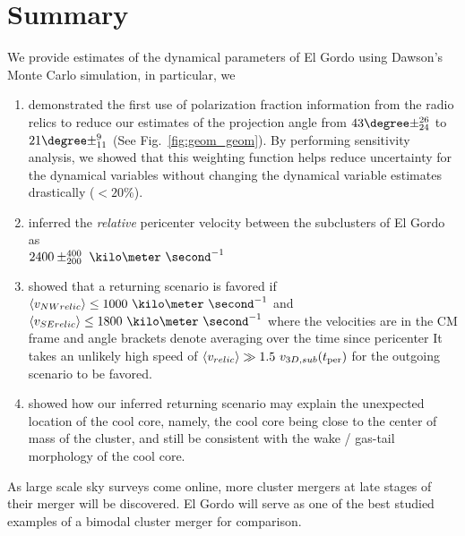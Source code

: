 \documentclass[ucdthesis.tex]{subfiles}
\begin{document}
    \section{Summary} 
    We provide estimates of the dynamical parameters of El Gordo using Dawson's
    Monte Carlo simulation, in particular, we 
    \begin{enumerate}
    	\item demonstrated the first use of polarization fraction information from
    		the radio relics to reduce our estimates of the projection angle from
    		$43\degree \pm ^{26}_{24}$ to $21 \degree \pm^{9}_{11}$ (See
    		Fig.~\ref{fig:geom_geom}). By performing sensitivity analysis, we
    		showed that this weighting function helps reduce uncertainty for the dynamical
    		variables without changing the dynamical variable estimates drastically ($< 20\%$).\\ 
    	\item inferred the {\it relative} pericenter velocity 
    		between the subclusters of El Gordo as\\ 
    		$2400\pm^{400}_{200}~\kilo\meter~\second^{-1}$ \\ 
    	\item showed that a returning scenario is favored if $\langle v_{NW relic}\rangle \leq
    		1000~\kilo
    		\meter~\second^{-1}$ and $\langle v_{SE relic}\rangle \leq
    		1800~\kilo\meter~\second^{-1}$
    where the velocities are in the CM frame and angle brackets denote averaging over the time since pericenter
    		It takes
    		an unlikely high speed of $\langle v_{relic} \rangle \gg 1.5~v_{3D,
    		sub}(t_{\rm per})$ for the outgoing scenario to be favored. \\ 
    	\item showed how our inferred
    		returning scenario may explain the unexpected location of the cool
    		core, namely, the cool core being close to the center of mass of the
    		cluster, and still be consistent with the wake / gas-tail morphology of the cool core. 
    \end{enumerate}
    As large scale sky surveys come online, more cluster mergers at late
    stages of their merger will be discovered. El Gordo will serve as one of
    the best studied examples of a bimodal cluster merger for comparison.  
    
    
		
		\singlespacing
		{}
		\newpage
		
\end{document}

